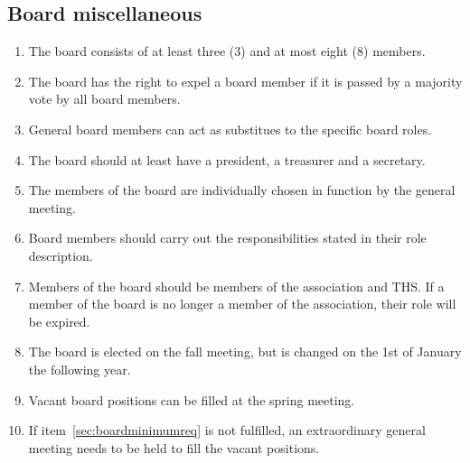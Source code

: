 \subsection{Board miscellaneous}
\begin{enumerate}
  \item The board consists of at least three (3) and at most eight (8) members.
  \item The board has the right to expel a board member if it is passed by a majority vote by all board members.
  \item General board members can act as substitues to the specific board roles.
  \item The board should at least have a president, a treasurer and a secretary. \label{sec:boardminimumreq}
  \item The members of the board are individually chosen in function by the general meeting.
  \item Board members should carry out the responsibilities stated in their role description.
  \item Members of the board should be members of the association and THS. If a member of the board is no longer a member of the association, their role will be expired.
  \item The board is elected on the fall meeting, but is changed on the 1st of January the following year.
  \item Vacant board positions can be filled at the spring meeting.
  \item If item~\ref{sec:boardminimumreq} is not fulfilled, an extraordinary general meeting needs to be held to fill the vacant positions.
\end{enumerate}

